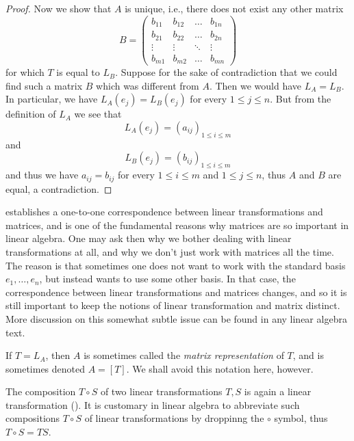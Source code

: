 \begin{proof}
  Now we show that \(A\) is unique, i.e., there does not exist any other matrix
  \[
    B = \begin{pmatrix}
      b_{11} & b_{12} & \dots  & b_{1n} \\
      b_{21} & b_{22} & \dots  & b_{2n} \\
      \vdots & \vdots & \ddots & \vdots \\
      b_{m1} & b_{m2} & \dots  & b_{mn}
    \end{pmatrix}
  \]
  for which \(T\) is equal to \(L_B\).
  Suppose for the sake of contradiction that we could find such a matrix \(B\) which was different from \(A\).
  Then we would have \(L_A = L_B\).
  In particular, we have \(L_A(e_j) = L_B(e_j)\) for every \(1 \leq j \leq n\).
  But from the definition of \(L_A\) we see that
  \[
    L_A(e_j) = (a_{ij})_{1 \leq i \leq m}
  \]
  and
  \[
    L_B(e_j) = (b_{ij})_{1 \leq i \leq m}
  \]
  and thus we have \(a_{ij} = b_{ij}\) for every \(1 \leq i \leq m\) and \(1 \leq j \leq n\), thus \(A\) and \(B\) are equal, a contradiction.
\end{proof}

\begin{rmk}\label{ii:6.1.14}
   establishes a one-to-one correspondence between linear transformations and matrices, and is one of the fundamental reasons why matrices are so important in linear algebra.
  One may ask then why we bother dealing with linear transformations at all, and why we don't just work with matrices all the time.
  The reason is that sometimes one does not want to work with the standard basis \(e_1, \dots, e_n\), but instead wants to use some other basis.
  In that case, the correspondence between linear transformations and matrices changes, and so it is still important to keep the notions of linear transformation and matrix distinct.
  More discussion on this somewhat subtle issue can be found in any linear algebra text.
\end{rmk}

\begin{rmk}\label{ii:6.1.15}
  If \(T = L_A\), then \(A\) is sometimes called the \emph{matrix representation} of \(T\), and is sometimes denoted \(A = [T]\).
  We shall avoid this notation here, however.
\end{rmk}

\begin{note}
  The composition \(T \circ S\) of two linear transformations \(T, S\) is again a linear transformation ().
  It is customary in linear algebra to abbreviate such compositions \(T \circ S\) of linear transformations by droppinng the \(\circ\) symbol, thus \(T \circ S = TS\).
\end{note}

